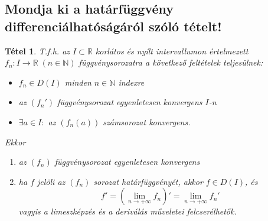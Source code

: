\documentclass[12pt,a4paper]{article}
\newcommand{\R}{\mathbb{R}}
\newcommand{\N}{\mathbb{N}}
\newcommand{\fn}{f_n}
\newcommand{\bb}[1]{\left( #1 \right)}
\newtheorem{tet}{Tétel}[section]
\begin{document}
\subsection{Mondja ki a határfüggvény differenciálhatóságáról szóló tételt!}
\begin{tet}
T.f.h. az $I \subset \R$ korlátos és nyílt intervallumon értelmezett $\fn : I \to \R \; \bb{n\in \N}$ függvénysorozatra a következő feltételek teljesülnek:
\begin{itemize}
\item $\fn \in D\bb{I}$ minden $n \in \N$ indexre
\item az $\bb{\fn'}$ függvénysorozat egyenletesen konvergens $I$-n
\item $\exists a \in I:$ az $\bb{\fn(a)}$ számsorozat konvergens.
\end{itemize}
Ekkor
\begin{enumerate}
\item az $\bb{\fn}$ függvénysorozat egyenletesen konvergens
\item ha $f$ jelöli az $\bb{\fn}$ sorozat határfüggvényét, akkor $f \in D(I)$, és
\[
f' = \bb{\lim\limits_{n \to +\infty}\fn}' = \lim\limits_{n \to +\infty} \fn'
\]
vagyis a limeszképzés és a deriválás műveletei felcserélhetők.
\end{enumerate}
\end{tet}
\end{document}
